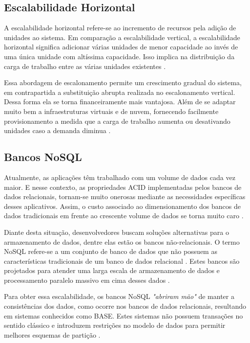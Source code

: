 \subsection{Escalabilidade Horizontal}

A escalabilidade horizontal refere-se ao incremento de recursos pela adição
de unidades ao sistema. Em comparação a escalabilidade vertical, a escalabilidade
horizontal significa adicionar várias unidades de menor capacidade ao invés de
uma única unidade com altíssima capacidade. Isso implica na distribuição da carga
de trabalho entre as várias unidades existentes \cite{FreshGuide2012}.

Essa abordagem de escalonamento permite um crescimento gradual do sistema, em
contrapartida a substituição abrupta realizada no escalonamento vertical. Dessa
forma ela se torna financeiramente mais vantajosa. Além de se adaptar muito bem
a infraestruturas virtuais e de nuvem, fornecendo facilmente provisionamento
a medida que a carga de trabalho aumenta ou desativando unidades caso a demanda
diminua \cite{InterSystems2019}.

\subsection{Bancos NoSQL}

Atualmente, as aplicações têm trabalhado com um volume de dados cada vez maior.
E nesse contexto, as propriedades \gls{ACID} implementadas pelos bancos de dados relacionais,
tornam-se muito onerosas mediante as necessidades específicas desses aplicativos.
Assim, o custo associado ao dimensionamento dos bancos de dados tradicionais em
frente ao crescente volume de dados se torna muito caro \cite{Gajendran}.

Diante desta situação, desenvolvedores buscam soluções alternativas para o
armazenamento de dados, dentre elas estão os bancos não-relacionais. O termo
\gls{NoSQL} refere-se a um conjunto de banco de dados que não possuem as características
tradicionais de um banco de dados relacional \cite{Gajendran}. Estes bancos são projetados
para atender uma larga escala de armazenamento de dados e processamento paralelo
massivo em cima desses dados \cite{NewEraOfDatabases}.

Para obter essa escalabilidade, os bancos \gls{NoSQL} \textit{"abriram mão"} de
manter a consistências dos dados, como ocorre nos bancos de dados relacionais,
resultando em sistemas conhecidos como \gls{BASE}. Estes sistemas não possuem
transações no sentido clássico e introduzem restrições no modelo de dados
para permitir melhores esquemas de partição .

